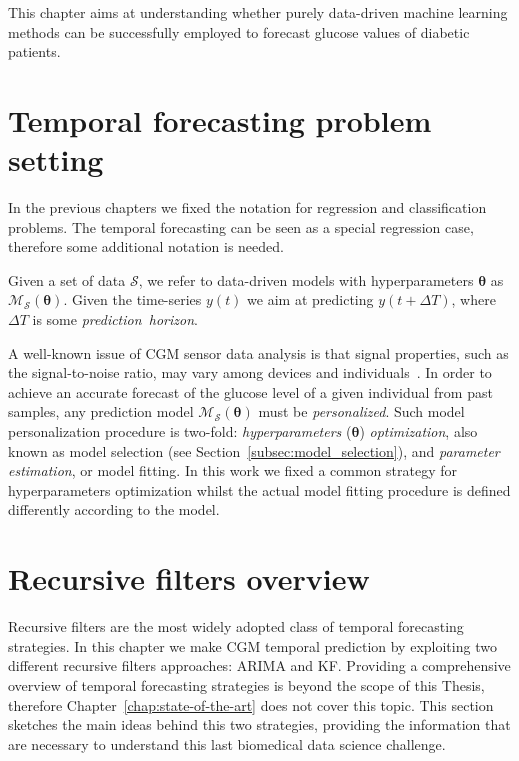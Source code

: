 This chapter aims at understanding whether purely data-driven machine learning methods can be successfully employed to forecast glucose values of diabetic patients.  

\section{Temporal forecasting problem setting}

In the previous chapters we fixed the notation for regression and classification problems. The temporal forecasting can be seen as a special regression case, therefore some additional notation is needed.

Given a set of data $\mathcal{S}$, we refer to data-driven models with hyperparameters $\bm{\theta}$ as $\mathcal{M}_\mathcal{S}(\bm{\theta})$.
Given the time-series $y(t)$ we aim at predicting $y(t+\Delta T)$, where $\Delta T$ is some {\em prediction~horizon}.

A well-known issue of CGM sensor data analysis is that signal properties, such as the signal-to-noise ratio, may vary among devices and individuals~\cite{facchinetti2010online}. In order to achieve an accurate forecast of the glucose level of a given individual from past samples, any prediction model $\mathcal{M}_\mathcal{S}(\bm{\theta})$ must be \textit{personalized}. Such model personalization procedure is two-fold: \textit{hyperparameters }($\bm{\theta}$) \textit{optimization}, also known as model selection (see Section~\ref{subsec:model_selection}), and {\em parameter estimation}, or model fitting. 
In this work we fixed a common strategy for hyperparameters optimization whilst the actual model fitting procedure is defined differently according to the model. 

\section{Recursive filters overview} \label{sec:recursive_filters}
Recursive filters are the most widely adopted class of temporal forecasting strategies.
In this chapter we make CGM temporal prediction by exploiting two different recursive filters approaches: ARIMA and KF. Providing a comprehensive overview of temporal forecasting strategies is beyond the scope of this Thesis, therefore Chapter~\ref{chap:state-of-the-art} does not cover this topic. This section sketches the main ideas behind this two strategies, providing the information that are necessary to understand this last biomedical data science challenge.

